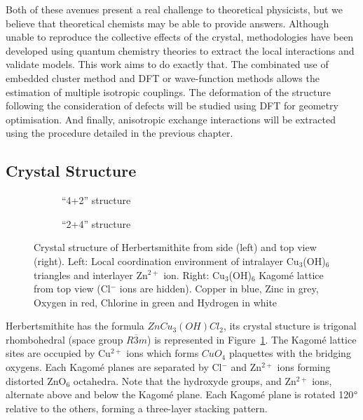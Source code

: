 \documentclass[12pt,a4paper]{report}
\numberwithin{equation}{section}
\begin{document}
Both of these avenues present a real challenge to theoretical physicists, but we believe that theoretical chemists may be able to provide answers.
Although unable to reproduce the collective effects of the crystal, methodologies have been developed using quantum chemistry theories to extract the local interactions and validate models.
This work aims to do exactly that.
The combinated use of embedded cluster method and DFT or wave-function methods allows the estimation of multiple isotropic couplings.
The deformation of the structure following the consideration of defects will be studied using DFT for geometry optimisation.
And finally, anisotropic exchange interactions will be extracted using the procedure detailed in the previous chapter.


\subsection*{Crystal Structure}

\begin{figure}[H]
    \centering
    \begin{subfigure}{.5\textwidth}
      \centering
      \caption{``4+2'' structure}
    \end{subfigure}%
    \begin{subfigure}{.5\textwidth}
      \centering
      \caption{``2+4'' structure}
    \end{subfigure}
    \caption[Crystal structure of Herbertsmithite from side (left) and top (right) view]{Crystal structure of Herbertsmithite from side (left) and top view (right). Left: Local coordination environment of intralayer Cu$_3$(OH)$_6$ triangles and interlayer Zn$^{2+}$ ion. Right: Cu$_3$(OH)$_6$ Kagomé lattice from top view (Cl$^-$ ions are hidden). Copper in blue, Zinc in grey, Oxygen in red, Chlorine in green and Hydrogen in white}
    \label{fig:Herbert}
\end{figure}


Herbertsmithite has the formula $ZnCu_3(OH)Cl_2$, its crystal stucture is trigonal rhombohedral (space group $R{\overline{3}m}$) is represented in Figure~\ref{fig:Herbert}.
The Kagomé lattice sites are occupied by Cu$^{2+}$ ions which forms $CuO_4$ plaquettes with the bridging oxygens. 
Each Kagomé planes are separated by Cl$^-$ and Zn$^{2+}$ ions forming distorted ZnO$_6$ octahedra. 
Note that the hydroxyde groups, and Zn$^{2+}$ ions, alternate above and below the Kagomé plane.
Each Kagomé plane is rotated 120$\degree$ relative to the others, forming a three-layer stacking pattern.
\end{document}

